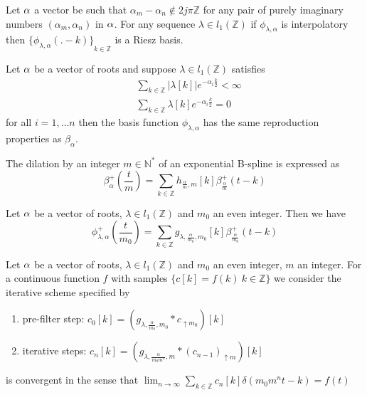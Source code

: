 \documentclass[a4paper, 11pt]{article}
\begin{document}
\begin{prop}{1}
  Let ${\bf \alpha}$ a vector be such that $\alpha_m-\alpha_n \not\in 2j\pi\mathbb{Z}$ for any pair of purely imaginary 
numbers $(\alpha_m, \alpha_n)$ in ${\bf \alpha}$. For any sequence $\lambda \in l_1(\mathbb{Z})$ if $\phi_{\lambda, 
\alpha}$ is interpolatory then ${\{ \phi_{\lambda, \alpha}(.-k) \}}_{k \in \mathbb{Z}}$ is a Riesz basis.  \end{prop}

\begin{prop}{2}
  Let ${\bf \alpha}$ be a vector of roots and suppose $\lambda \in l_1(\mathbb{Z})$ satisfies
  \begin{align*}
    &\sum_{k \in \mathbb{Z}} |\lambda[k]| e^{-\alpha_i \frac{k}{2}} < \infty \\
    &\sum_{k \in \mathbb{Z}} \lambda[k] e^{-\alpha_i \frac{k}{2}} = 0
  \end{align*}
  for all $i=1, \ldots n$ then the basis function $\phi_{\lambda, \alpha}$ has the same reproduction properties as 
  $\beta_{\alpha}$.
\end{prop}

The dilation by an integer $m \in \mathbb{N}^*$ of an exponential B-spline is expressed as
\begin{equation*}
  \beta^+_{\alpha}(\frac{t}{m}) = \sum_{k \in \mathbb{Z}} h_{\frac{\alpha}{m}, m}[k] \beta^+_{\frac{\alpha}{m}}(t-k)
\end{equation*}

\begin{prop}{3}
  Let ${\bf \alpha}$ be a vector of roots, $\lambda \in l_1(\mathbb{Z})$ and $m_0$ an even integer. Then we have
  \begin{equation}
    \phi^+_{\lambda, \alpha}(\frac{t}{m_0}) = \sum_{k \in \mathbb{Z}} g_{\lambda, \frac{\alpha}{m_0}, m_0}[k] 
    \beta^+_{\frac{\alpha}{m_0}}(t-k)
  \end{equation}
\end{prop}

\begin{prop}{4}
  Let ${\bf \alpha}$ be a vector of roots, $\lambda \in l_1(\mathbb{Z})$ and $m_0$ an even integer, $m$ an integer. For 
  a continuous function $f$ with samples $\{c[k] = f(k) \ k \in \mathbb{Z}\}$ we consider the iterative scheme specified 
  by
  \begin{enumerate}
    \item pre-filter step: $c_0[k] = \left(g_{\lambda, \frac{\alpha}{m_0}, m_0}*c_{\uparrow m_0}\right)[k]$
    \item iterative steps: $c_n[k] = \left(g_{\lambda, \frac{\alpha}{m_0m^n}, m}*{(c_{n-1})}_{\uparrow m}\right)[k]$
  \end{enumerate}

  is convergent in the sense that $\displaystyle \lim_{n \to \infty} \sum_{k \in \mathbb{Z}} c_n[k]\delta(m_0 m^n t-k) = 
  f(t)$
\end{prop}
\end{document}
